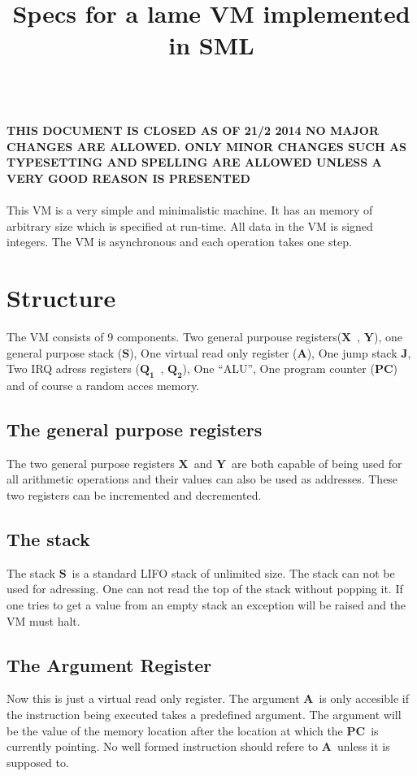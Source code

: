 \documentclass{article}
\title{Specs for a lame VM implemented in SML}
\newcommand{\x}{$\textbf{X}$}
\newcommand{\y}{$\textbf{Y}$}
\newcommand{\s}{$\textbf{S}$}
\newcommand{\A}{$\textbf{A}$}
\newcommand{\q}{$\textbf{Q}_{\textbf{1}}$}
\newcommand{\qq}{$\textbf{Q}_{\textbf{2}}$}
\newcommand{\pc}{$\textbf{PC}$}
\newcommand{\J}{$\textbf{J}$}
\begin{document}
\maketitle
\\
\large{\textbf{
THIS DOCUMENT IS CLOSED AS OF 21/2 2014
NO MAJOR CHANGES ARE ALLOWED. ONLY MINOR CHANGES SUCH AS 
TYPESETTING AND SPELLING ARE ALLOWED UNLESS A VERY GOOD
REASON IS PRESENTED
}
}\\
\\
\normalsize
This VM is a very simple and minimalistic machine. It has an memory of
arbitrary size which is specified at run-time. All data in the VM is signed
integers. The VM is asynchronous and each operation takes one step.
\section{Structure}
The VM consists of 9 components. Two general purpouse registers(\x \ , \y ), one
general purpose stack (\s), One virtual read only register (\A), One jump stack
\J, Two IRQ adress registers (\q \ , \qq), One ``ALU'', One program counter
(\pc) and of course a random acces memory.

\subsection{The general purpose registers}
The two general purpose registers \x \ and \y \ are both capable of being used
for all arithmetic operations and their values can also be used as addresses.
These two registers can be incremented and decremented.

\subsection{The stack}
The stack \s \ is a standard LIFO stack of unlimited size. The stack can not be
used for adressing. One can not read the top of the stack without popping it. If
one tries to get a value from an empty stack an exception will be raised and the
VM must halt.

\subsection{The Argument Register}
Now this is just a virtual read only register. The argument \A \  is only
accesible if the instruction being executed takes a predefined argument. The
argument will be the value of the memory location after the location at which
the \pc \  is currently pointing. No well formed instruction should refere to
\A \ unless it is supposed to.
\end{document}
